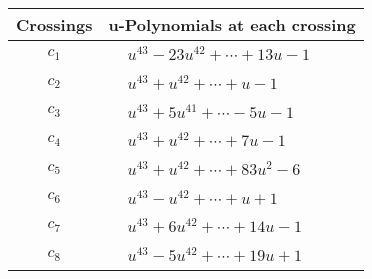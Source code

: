 \documentclass[1p]{elsarticle_modified}
\theoremstyle{definition}
\begin{document}
\begin{tabular}{m{50pt}|m{274pt}}
Crossings & \hspace{64pt}u-Polynomials at each crossing \\
\hline $$\begin{aligned}c_{1}\end{aligned}$$&$\begin{aligned}
&u^{43}-23 u^{42}+\cdots+13 u-1
\end{aligned}$\\
\hline $$\begin{aligned}c_{2}\end{aligned}$$&$\begin{aligned}
&u^{43}+u^{42}+\cdots+u-1
\end{aligned}$\\
\hline $$\begin{aligned}c_{3}\end{aligned}$$&$\begin{aligned}
&u^{43}+5 u^{41}+\cdots-5 u-1
\end{aligned}$\\
\hline $$\begin{aligned}c_{4}\end{aligned}$$&$\begin{aligned}
&u^{43}+u^{42}+\cdots+7 u-1
\end{aligned}$\\
\hline $$\begin{aligned}c_{5}\end{aligned}$$&$\begin{aligned}
&u^{43}+u^{42}+\cdots+83 u^2-6
\end{aligned}$\\
\hline $$\begin{aligned}c_{6}\end{aligned}$$&$\begin{aligned}
&u^{43}- u^{42}+\cdots+u+1
\end{aligned}$\\
\hline $$\begin{aligned}c_{7}\end{aligned}$$&$\begin{aligned}
&u^{43}+6 u^{42}+\cdots+14 u-1
\end{aligned}$\\
\hline $$\begin{aligned}c_{8}\end{aligned}$$&$\begin{aligned}
&u^{43}-5 u^{42}+\cdots+19 u+1
\end{aligned}$\\

\end{tabular}
\end{document}
